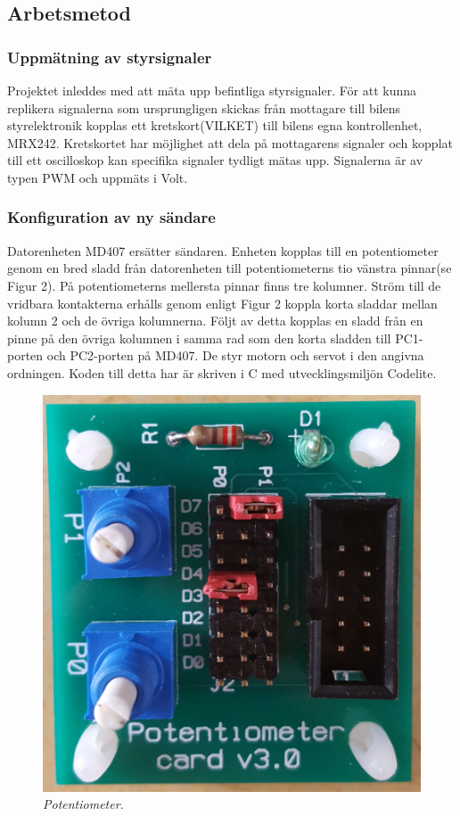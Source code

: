 \documentclass[a4paper]{article}
\begin{document}
\subsection{Arbetsmetod}
\subsubsection{Uppmätning av styrsignaler}
Projektet inleddes med att mäta upp befintliga styrsignaler. För att kunna replikera signalerna som ursprungligen skickas från mottagare till bilens styrelektronik kopplas ett kretskort(VILKET) till bilens egna kontrollenhet, MRX242. Kretskortet har möjlighet att dela på mottagarens signaler och kopplat till ett oscilloskop kan specifika signaler tydligt mätas upp. Signalerna är av typen PWM och uppmäts i Volt. 


\subsubsection{Konfiguration av ny sändare}
\vspace{5mm} \noindent
Datorenheten MD407 ersätter sändaren. Enheten kopplas till en potentiometer genom en bred sladd från datorenheten till potentiometerns tio vänstra pinnar(se Figur 2). På potentiometerns mellersta pinnar finns tre kolumner. Ström till de vridbara kontakterna erhålls genom enligt Figur 2 koppla korta sladdar mellan kolumn 2 och de övriga kolumnerna. Följt av detta kopplas en sladd från en pinne på den övriga kolumnen i samma rad som den korta sladden till PC1-porten och PC2-porten på MD407. De styr motorn och servot i den angivna ordningen. Koden till detta har är skriven i C med utvecklingsmiljön Codelite.



\begin{figure}[H]
\includegraphics[scale=0.05]{Potentiometer.jpg}
\centering
\caption{\it Potentiometer.}
\end{figure} 
\end{document}
